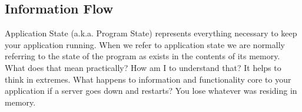 \documentclass[12pt,twoside]{article}
\begin{document}
\subsection{Information Flow}
Application State (a.k.a. Program State) represents everything necessary to keep your application running.  When we refer to application state we are normally referring to the state of the program as exists in the contents of its memory.  What does that mean practically?  How am I to understand that?  It helps to think in extremes.  What happens to information and functionality core to your application if a server goes down and restarts?  You lose whatever was residing in memory.





\end{document}
